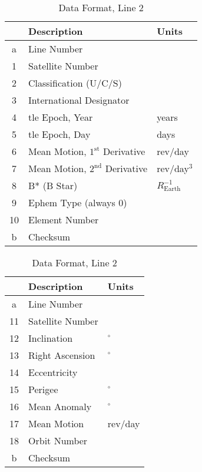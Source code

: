\begin{table}[!htb]\small

\begin{minipage}{.49\textwidth}
\centering

\caption{Data Format, Line 1}
\label{tab:tle-line-1}

\medskip

\begin{tabular}{|c|ll|}
\hline

\multicolumn{1}{|l|}{} & \multicolumn{1}{l|}{Description} & \multicolumn{1}{l|}{Units} \\ \hline
a  & Line Number   &   \\ \hline
1  & Satellite Number   &   \\
2  & Classification (U/C/S)   &   \\
3  & International Designator   &   \\
4  & \gls{tle} Epoch, Year   & years  \\ 
5  & \gls{tle} Epoch, Day   & days  \\
6  & Mean Motion, $1^{\mathrm{st}}$ Derivative & rev/day  \\
7  & Mean Motion, $2^{\mathrm{nd}}$ Derivative    & rev/day$^3$  \\
8  & B* (B Star)   & $R_{\mathrm{Earth}}^{-1}$  \\
9  &  Ephem Type (always 0)  &   \\
10  &  Element Number  &   \\ \hline
b  & Checksum   &  \\
\hline

\end{tabular}
\end{minipage}\hfill
\begin{minipage}{.49\textwidth}
\centering

\caption{Data Format, Line 2}
\label{tab:tle-line-2}

\medskip

\begin{tabular}{|c|ll|}
\hline

\multicolumn{1}{|l|}{} & \multicolumn{1}{l|}{Description} & \multicolumn{1}{l|}{Units} \\ \hline
a  & Line Number   &   \\ \hline
11 & Satellite Number   &   \\
12 & Inclination   & $^\circ$  \\
13 & Right Ascension   & $^\circ$  \\
14 & Eccentricity &   \\
15 & Perigee & $^\circ$  \\
16 & Mean Anomaly & $^\circ$ \\
17 & Mean Motion & rev/day \\
18 & Orbit Number &  \\ \hline
b  & Checksum   &  \\
\hline

\end{tabular}
\end{minipage}


\end{table}

